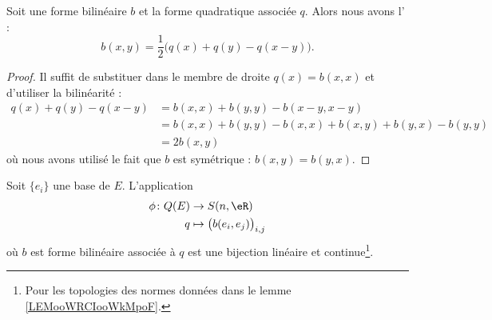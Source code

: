 \begin{proposition} \label{PROPooZLXVooOsXCcB}
	Soit une forme bilinéaire \( b\) et la forme quadratique associée \( q\). Alors nous avons l' :
	\begin{equation}    \label{EqMrbsop}
		b(x,y)=\frac{ 1 }{2}\big( q(x)+q(y)-q(x-y) \big).
	\end{equation}
\end{proposition}

\begin{proof}
	Il suffit de substituer dans le membre de droite \( q(x)=b(x,x)\) et d'utiliser la bilinéarité :
	\begin{subequations}
		\begin{align}
			q(x)+q(y)-q(x-y) & =b(x,x)+b(y,y)-b(x-y,x-y)                  \\
			                 & =b(x,x)+b(y,y)-b(x,x)+b(x,y)+b(y,x)-b(y,y) \\
			                 & =2b(x,y)
		\end{align}
	\end{subequations}
	où nous avons utilisé le fait que \( b\) est symétrique : \( b(x,y)=b(y,x)\).
\end{proof}

\begin{proposition} \label{PropFSXooRUMzdb}
	Soit \( \{ e_i \}\) une base de \( E\). L'application
	\begin{equation}
		\begin{aligned}
			\phi\colon Q(E) & \to S(n,\eR)                             \\
			q               & \mapsto \big(   b(e_i,e_j)   \big)_{i,j}
		\end{aligned}
	\end{equation}
	où \( b\) est forme bilinéaire associée à \( q\) est une bijection linéaire et continue\footnote{Pour les topologies des normes données dans le lemme \ref{LEMooWRCIooWkMpoF}.}.
\end{proposition}

